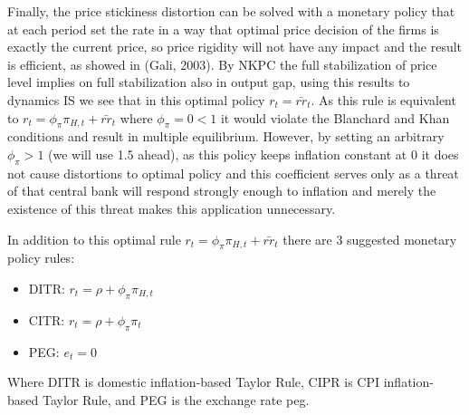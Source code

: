 \documentclass{article}
\begin{document}
Finally, the price stickiness distortion can be solved with a monetary policy that at each period set the rate in a way that optimal price decision of the firms is exactly the current price, so price rigidity will not have any impact and the result is efficient, as showed in (Gali, 2003). By NKPC the full stabilization of price level implies on full stabilization also in output gap, using this results to dynamics IS we see that in this optimal policy $r_t = \bar{rr}_t$. As this rule is equivalent to $r_t =  \phi_\pi \pi_{H,t} + \bar{rr}_t$ where $\phi_\pi = 0 < 1$ it would violate the Blanchard and Khan conditions and result in multiple equilibrium. However, by setting an arbitrary $\phi_\pi >1$ (we will use 1.5 ahead), as this policy keeps inflation constant at 0 it does not cause distortions to optimal policy and this coefficient serves only as a threat of that central bank will respond strongly enough to inflation and merely the existence of this threat makes this application unnecessary.


In addition to this optimal rule $r_t = \phi_\pi \pi_{H,t} + \bar{rr}_t$ there are 3 suggested monetary policy rules:
\begin{itemize}
    \item DITR: $r_t = \rho + \phi_\pi \pi_{H,t}$
    \item CITR: $r_t = \rho + \phi_\pi \pi_{t}$
    \item PEG: $e_t = 0$
\end{itemize}

Where DITR is domestic inflation-based Taylor Rule, CIPR is CPI inflation-based Taylor Rule, and PEG is the exchange rate peg. 
\end{document}
